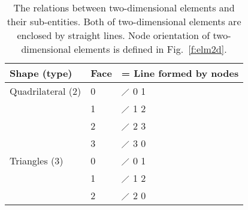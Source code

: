 \documentclass[11pt,dvips]{article}
\newcommand{\topcaption}{%
\setlength{\abovecaptionskip}{0pt}%
\setlength{\belowcaptionskip}{10pt}%
\caption}
\numberwithin{equation}{section}
\begin{document}
%
\begin{table}
\centering

\topcaption{
%
The relations between two-dimensional elements and their sub-entities.  Both of
two-dimensional elements are enclosed by straight lines.  Node orientation of
two-dimensional elements is defined in Fig.~\ref{f:elm2d}.
%
}

\label{t:subent2d}
\begin{tabular}{lll}
\toprule
Shape (type)      & Face & = Line formed by nodes \\
\midrule
Quadrilateral (2) & 0    & $\diagup$ 0 1          \\
                  & 1    & $\diagup$ 1 2          \\
                  & 2    & $\diagup$ 2 3          \\
                  & 3    & $\diagup$ 3 0          \\
\midrule
Triangles (3)     & 0    & $\diagup$ 0 1          \\
                  & 1    & $\diagup$ 1 2          \\
                  & 2    & $\diagup$ 2 0          \\
\bottomrule
\end{tabular}
\end{table}
%
\end{document}
